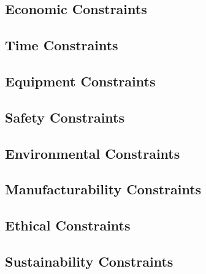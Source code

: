 \subsection{Economic Constraints}
\subsection{Time Constraints}
\subsection{Equipment Constraints}
\subsection{Safety Constraints}
\subsection{Environmental Constraints}
\subsection{Manufacturability Constraints}
\subsection{Ethical Constraints}
\subsection{Sustainability Constraints}